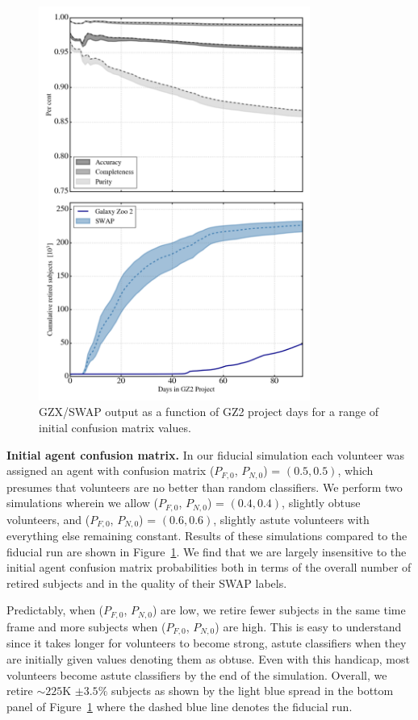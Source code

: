 \documentclass[twocolumn]{aastex6}
\newcommand{\Pf}{$P_{F,0}$}
\newcommand{\Pn}{$P_{N,0}$}
\begin{document}
\begin{figure}[t!]
\includegraphics[width=3.5in]{figures/GZX_eval_and_retirement_PLPD_spread_4paper_v2.png}
\caption{GZX/SWAP output as a function of GZ2 project days for a range of initial
confusion matrix values.  \label{fig: confusionMatrixAnalysis}}
\end{figure}

\textbf{Initial agent confusion matrix.} 
In our fiducial simulation each volunteer was assigned an agent with confusion matrix
 (\Pf, \Pn) = $(0.5, 0.5)$, which presumes that volunteers are no better than 
random classifiers.  We perform two simulations wherein we allow (\Pf, \Pn) = $(0.4, 0.4)$, 
slightly obtuse volunteers, and (\Pf, \Pn) = $(0.6, 0.6)$, slightly astute volunteers 
with everything else remaining constant.  
Results of these simulations compared to the fiducial run are shown in 
Figure~\ref{fig: confusionMatrixAnalysis}. We find that we are largely insensitive to the 
initial agent confusion matrix probabilities both in terms of the overall number of retired subjects
and in the quality of their SWAP labels. 

Predictably, when (\Pf, \Pn) are low, we retire fewer subjects in the same time frame and 
more subjects when (\Pf, \Pn) are high. This is easy to understand since it takes 
longer for volunteers to become strong, astute classifiers when they are initially 
given values denoting them as obtuse. Even with this handicap, most volunteers 
become astute classifiers by the end of the simulation. Overall,  we retire 
$\sim225$K  $\pm 3.5\%$ subjects as shown by the light blue spread in the bottom
panel of Figure~\ref{fig: confusionMatrixAnalysis} where the dashed blue line
denotes the fiducial run. 
\end{document}
